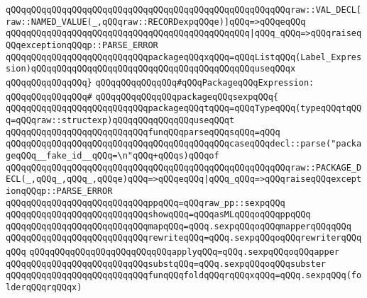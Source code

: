 \verb|qQQqqQQqqQQqqQQqqQQqqQQqqQQqqQQqqQQqqQQqqQQqqQQqqQQqqQQqraw::VAL_DECL[raw::NAMED_VALUE(_,qQQqraw::RECORDexpqQQqe)]qQQq=>qQQqeqQQq|\newline
\verb|qQQqqQQqqQQqqQQqqQQqqQQqqQQqqQQqqQQqqQQqqQQqqQQq|\verb#|qQQq_qQQq=>qQQqraiseqQQqexceptionqQQqp::PARSE_ERROR#\newline
\verb|qQQqqQQqqQQqqQQqqQQqqQQqqQQqpackageqQQqxqQQq=qQQqListqQQq(Label_Expression)qQQqqQQqqQQqqQQqqQQqqQQqqQQqqQQqqQQqqQQqqQQquseqQQqx|\newline
\verb|qQQqqQQqqQQqqQQq}|\newline
\newline
\verb|qQQqqQQqqQQqqQQq#qQQqPackageqQQqExpression:|\newline
\verb|qQQqqQQqqQQqqQQq#|\newline
\verb|qQQqqQQqqQQqqQQqpackageqQQqsexpqQQq{|\newline
\newline
\verb|qQQqqQQqqQQqqQQqqQQqqQQqqQQqpackageqQQqtqQQq=qQQqTypeqQQq(typeqQQqtqQQq=qQQqraw::structexp)qQQqqQQqqQQqqQQquseqQQqt|\newline
\verb|qQQqqQQqqQQqqQQqqQQqqQQqqQQqfunqQQqparseqQQqsqQQq=qQQq|\newline
\verb|qQQqqQQqqQQqqQQqqQQqqQQqqQQqqQQqqQQqqQQqqQQqcaseqQQqdecl::parse("packageqQQq__fake_id__qQQq=\n"qQQq+qQQqs)qQQqof|\newline
\verb|qQQqqQQqqQQqqQQqqQQqqQQqqQQqqQQqqQQqqQQqqQQqqQQqqQQqqQQqraw::PACKAGE_DECL(_,qQQq_,qQQq_,qQQqe)qQQq=>qQQqeqQQq|\verb#|qQQq_qQQq=>qQQqraiseqQQqexceptionqQQqp::PARSE_ERROR#\newline
\newline
\verb|qQQqqQQqqQQqqQQqqQQqqQQqqQQqppqQQq=qQQqraw_pp::sexpqQQq|\newline
\verb|qQQqqQQqqQQqqQQqqQQqqQQqqQQqshowqQQq=qQQqasMLqQQqoqQQqppqQQq|\newline
\verb|qQQqqQQqqQQqqQQqqQQqqQQqqQQqmapqQQq=qQQq.sexpqQQqoqQQqmapperqQQqqQQq|\newline
\verb|qQQqqQQqqQQqqQQqqQQqqQQqqQQqrewriteqQQq=qQQq.sexpqQQqoqQQqrewriterqQQqqQQq|\newline
\verb|qQQqqQQqqQQqqQQqqQQqqQQqqQQqapplyqQQq=qQQq.sexpqQQqoqQQqapper|\newline
\verb|qQQqqQQqqQQqqQQqqQQqqQQqqQQqsubstqQQq=qQQq.sexpqQQqoqQQqsubster|\newline
\newline
\verb|qQQqqQQqqQQqqQQqqQQqqQQqqQQqfunqQQqfoldqQQqrqQQqxqQQq=qQQq.sexpqQQq(folderqQQqrqQQqx)|\newline
\newline

